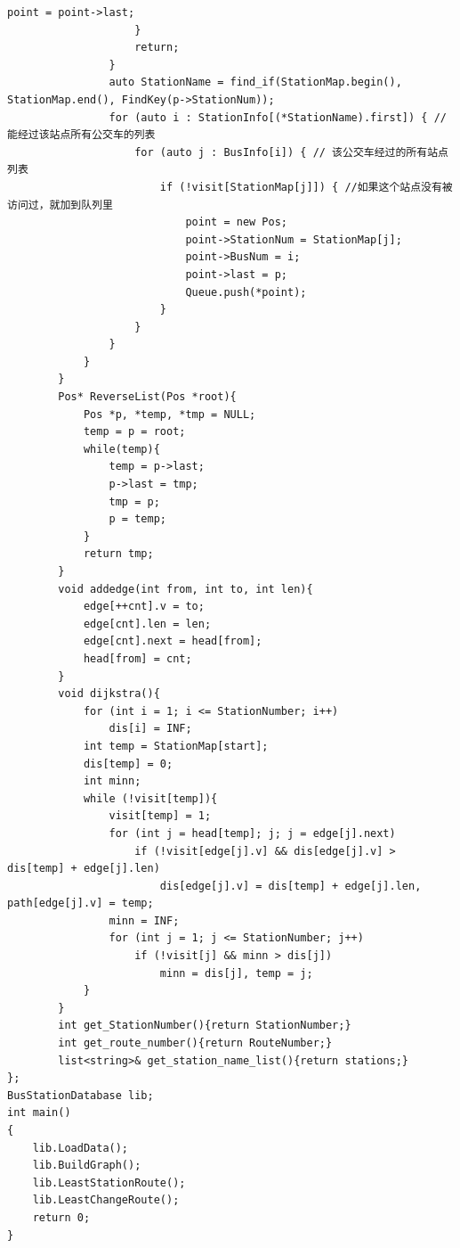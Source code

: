 \documentclass[a4paper,11pt,UTF8]{ctexart}
\begin{document}
\begin{lstlisting}[caption=BusRoute.cpp,captionpos=b]
                        point = point->last;
                    }
                    return;
                }
                auto StationName = find_if(StationMap.begin(), StationMap.end(), FindKey(p->StationNum));
                for (auto i : StationInfo[(*StationName).first]) { //能经过该站点所有公交车的列表
                    for (auto j : BusInfo[i]) { // 该公交车经过的所有站点列表
                        if (!visit[StationMap[j]]) { //如果这个站点没有被访问过，就加到队列里
                            point = new Pos;
                            point->StationNum = StationMap[j];
                            point->BusNum = i;
                            point->last = p;
                            Queue.push(*point);
                        }
                    }
                }
            }
        }
        Pos* ReverseList(Pos *root){
            Pos *p, *temp, *tmp = NULL;
            temp = p = root;
            while(temp){
                temp = p->last;
                p->last = tmp;
                tmp = p;
                p = temp;
            }
            return tmp;
        }
        void addedge(int from, int to, int len){
            edge[++cnt].v = to;
            edge[cnt].len = len;
            edge[cnt].next = head[from];
            head[from] = cnt;
        }
        void dijkstra(){
            for (int i = 1; i <= StationNumber; i++)
                dis[i] = INF;
            int temp = StationMap[start];
            dis[temp] = 0;
            int minn;
            while (!visit[temp]){
                visit[temp] = 1;
                for (int j = head[temp]; j; j = edge[j].next)
                    if (!visit[edge[j].v] && dis[edge[j].v] > dis[temp] + edge[j].len)
                        dis[edge[j].v] = dis[temp] + edge[j].len, path[edge[j].v] = temp;
                minn = INF;
                for (int j = 1; j <= StationNumber; j++)
                    if (!visit[j] && minn > dis[j])
                        minn = dis[j], temp = j;
            }
        }
        int get_StationNumber(){return StationNumber;}
        int get_route_number(){return RouteNumber;}
        list<string>& get_station_name_list(){return stations;}
};
BusStationDatabase lib;
int main()
{
    lib.LoadData();
    lib.BuildGraph();
    lib.LeastStationRoute();
    lib.LeastChangeRoute();
    return 0;
}
\end{lstlisting}
\end{document}
